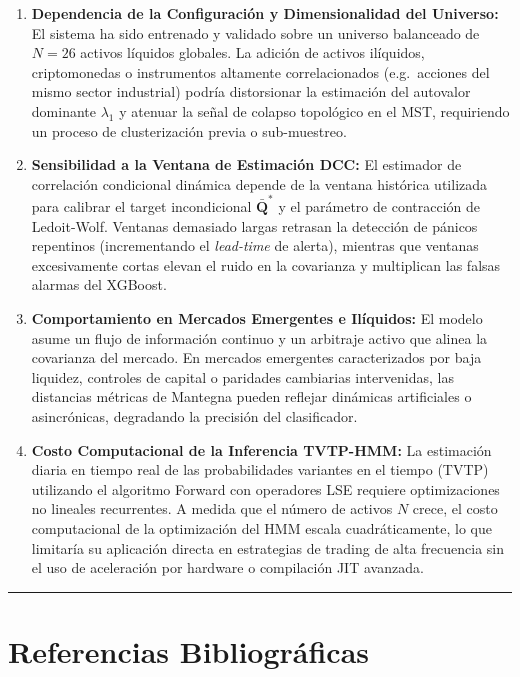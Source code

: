 \documentclass[
  12pt,
]{article}
\providecommand{\tightlist}{%
  \setlength{\itemsep}{0pt}\setlength{\parskip}{0pt}}
\begin{document}
\begin{enumerate}
\def\labelenumi{\arabic{enumi}.}
\tightlist
\item
  \textbf{Dependencia de la Configuración y Dimensionalidad del
  Universo:} El sistema ha sido entrenado y validado sobre un universo
  balanceado de \(N=26\) activos líquidos globales. La adición de
  activos ilíquidos, criptomonedas o instrumentos altamente
  correlacionados (e.g.~acciones del mismo sector industrial) podría
  distorsionar la estimación del autovalor dominante \(\lambda_1\) y
  atenuar la señal de colapso topológico en el MST, requiriendo un
  proceso de clusterización previa o sub-muestreo.
\item
  \textbf{Sensibilidad a la Ventana de Estimación DCC:} El estimador de
  correlación condicional dinámica depende de la ventana histórica
  utilizada para calibrar el target incondicional \(\bar{\mathbf{Q}}^*\)
  y el parámetro de contracción de Ledoit-Wolf. Ventanas demasiado
  largas retrasan la detección de pánicos repentinos (incrementando el
  \emph{lead-time} de alerta), mientras que ventanas excesivamente
  cortas elevan el ruido en la covarianza y multiplican las falsas
  alarmas del XGBoost.
\item
  \textbf{Comportamiento en Mercados Emergentes e Ilíquidos:} El modelo
  asume un flujo de información continuo y un arbitraje activo que
  alinea la covarianza del mercado. En mercados emergentes
  caracterizados por baja liquidez, controles de capital o paridades
  cambiarias intervenidas, las distancias métricas de Mantegna pueden
  reflejar dinámicas artificiales o asincrónicas, degradando la
  precisión del clasificador.
\item
  \textbf{Costo Computacional de la Inferencia TVTP-HMM:} La estimación
  diaria en tiempo real de las probabilidades variantes en el tiempo
  (TVTP) utilizando el algoritmo Forward con operadores LSE requiere
  optimizaciones no lineales recurrentes. A medida que el número de
  activos \(N\) crece, el costo computacional de la optimización del HMM
  escala cuadráticamente, lo que limitaría su aplicación directa en
  estrategias de trading de alta frecuencia sin el uso de aceleración
  por hardware o compilación JIT avanzada.
\end{enumerate}

\begin{center}\rule{0.5\linewidth}{0.5pt}\end{center}

\section{Referencias
Bibliográficas}\label{referencias-bibliogruxe1ficas}
\end{document}
